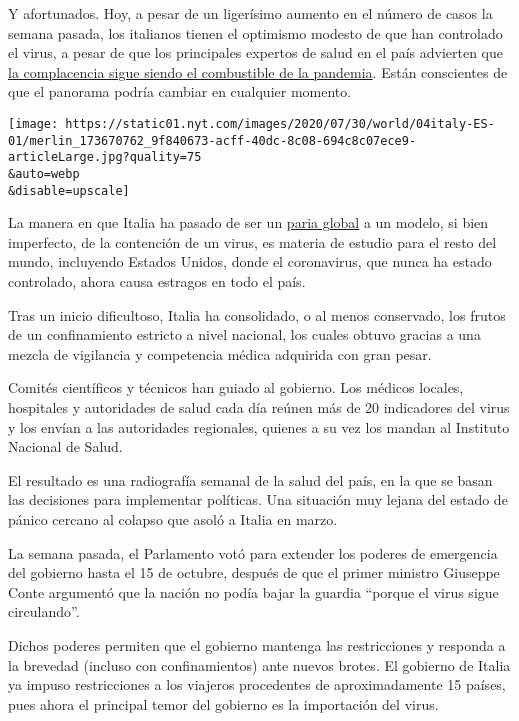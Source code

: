 Y afortunados. Hoy, a pesar de un ligerísimo aumento en el número de
casos la semana pasada, los italianos tienen el optimismo modesto de que
han controlado el virus, a pesar de que los principales expertos de
salud en el país advierten que
\href{https://www.nytimes.com/es/2020/07/21/espanol/mundo/errores-europa-coronavirus.html}{la
complacencia sigue siendo el combustible de la pandemia}. Están
conscientes de que el panorama podría cambiar en cualquier momento.

\texttt{[image: https://static01.nyt.com/images/2020/07/30/world/04italy-ES-01/merlin\_173670762\_9f840673-acff-40dc-8c08-694c8c07ece9-articleLarge.jpg?quality=75\\\&auto=webp\\\&disable=upscale]}

La manera en que Italia ha pasado de ser un
\href{https://www.nytimes.com/es/2020/03/22/espanol/coronavirus-lecciones-italia.html}{paria
global} a un modelo, si bien imperfecto, de la contención de un virus,
es materia de estudio para el resto del mundo, incluyendo Estados
Unidos, donde el coronavirus, que nunca ha estado controlado, ahora
causa estragos en todo el país.

Tras un inicio dificultoso, Italia ha consolidado, o al menos
conservado, los frutos de un confinamiento estricto a nivel nacional,
los cuales obtuvo gracias a una mezcla de vigilancia y competencia
médica adquirida con gran pesar.

Comités científicos y técnicos han guiado al gobierno. Los médicos
locales, hospitales y autoridades de salud cada día reúnen más de 20
indicadores del virus y los envían a las autoridades regionales, quienes
a su vez los mandan al Instituto Nacional de Salud.

El resultado es una radiografía semanal de la salud del país, en la que
se basan las decisiones para implementar políticas. Una situación muy
lejana del estado de pánico cercano al colapso que asoló a Italia en
marzo.

La semana pasada, el Parlamento votó para extender los poderes de
emergencia del gobierno hasta el 15 de octubre, después de que el primer
ministro Giuseppe Conte argumentó que la nación no podía bajar la
guardia ``porque el virus sigue circulando''.

Dichos poderes permiten que el gobierno mantenga las restricciones y
responda a la brevedad (incluso con confinamientos) ante nuevos brotes.
El gobierno de Italia ya impuso restricciones a los viajeros procedentes
de aproximadamente 15 países, pues ahora el principal temor del gobierno
es la importación del virus.

